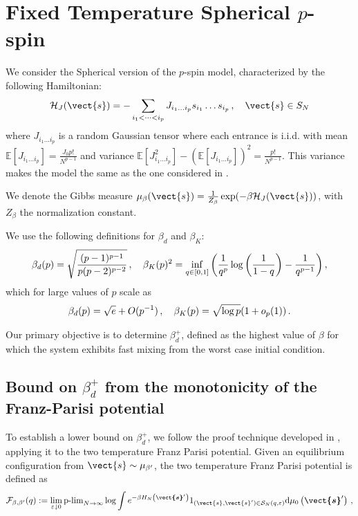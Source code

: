 \documentclass[]{article}
\theoremstyle{plain}%
\theoremstyle{definition}%
\theoremstyle{remark}%
\begin{document}
\title{}

\section{Fixed Temperature Spherical $p$-spin}
We consider the Spherical version of the $p$-spin model, characterized by the following Hamiltonian:
\begin{equation}\label{eq:H_pspin_spherical}
    \mathcal{H}_J(\vect{s}) = -\sum_{i_1<\dots<i_p}J_{i_1\dots i_p}s_{i_1}\dots s_{i_p}\,,\quad \vect{s}\in S_N
\end{equation}
where $J_{i_1\dots i_p}$ is a random Gaussian tensor where each entrance is i.i.d. with mean $\mathbb{E}[J_{i_1\dots i_p}]=\frac{J_0 p!}{N^{p-1}}$ and variance $\mathbb{E}[J^2_{i_1\dots i_p}] - \left(\mathbb{E}[J_{i_1\dots i_p}]\right)^2=\frac{p!}{N^{p-1}}$.
This variance makes the model the same as the one considered in \cite{alaoui_shattering_2024}.

We denote the Gibbs measure $\mu_{\beta}(\vect{s}) = \frac{1}{Z_{\beta}}\exp(-\beta\mathcal{H}_J(\vect{s})) $, with $Z_{\beta}$ the normalization constant.

We use the following definitions for $\beta_d$ and $\beta_K$:
\begin{equation}
    \beta_d(p) = \sqrt{\frac{(p-1)^{p-1}}{p (p-2)^{p-2}}}\,,\quad 
    \beta_K(p)^2 = \inf_{q \in [0,1]} \qty(\frac{1}{q^p} \log\qty(\frac{1}{1-q}) - \frac{1}{q^{p-1}}) \,,
\end{equation}
which for large values of $p$ scale as
\begin{equation}\label{eq:betad-betac-defs}
    \beta_d(p) = \sqrt{e} + O(p^{-1}) \,, \quad \beta_K(p) = \sqrt{\log p} \qty(1 + o_p(1)) \,.
\end{equation}

Our primary objective is to determine $\beta_d^+$, defined as the highest value of $\beta$ for which the system exhibits fast mixing from the worst case initial condition.

\subsection{Bound on $\beta_d^+$ from the monotonicity of the Franz-Parisi potential}

To establish a lower bound on $\beta_d^+$, we follow the proof technique developed in \cite{alaoui_shattering_2024}, applying it to the two temperature Franz Parisi potential. Given an equilibrium configuration from $\vect{s} \sim \mu_{\beta^\prime}$, the two temperature Franz Parisi potential is defined as
\begin{equation}\label{eq:FP-twotemp}
    \mathcal{F}_{\beta,\beta^\prime}(q) :=
    \lim _{\varepsilon \downarrow 0} \operatorname{p-lim}\limits_{N \to \infty} 
    \log 
    \int e^{-\beta H_N\left(\boldsymbol{\vect{s}}^{\prime}\right)} 1_{\left(\vect{s}, \vect{s}^{\prime}\right) \in \mathcal{S}_N(q, \varepsilon)} \mathrm{d} 
    \mu_0\left(\boldsymbol{\vect{s}}^{\prime}\right) \,,
\end{equation}
\end{document}
